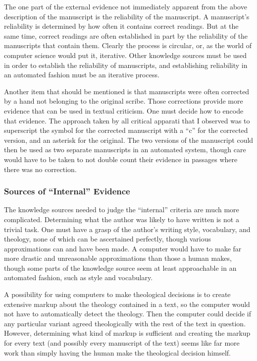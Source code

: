 \documentclass[onecolumn, 12pt]{article}
\begin{document}
The one part of the external evidence not immediately apparent from the above
description of the manuscript is the reliability of the manuscript.  A
manuscript's reliability is determined by how often it contains correct
readings.  But at the same time, correct readings are often established in part
by the reliability of the manuscripts that contain them.  Clearly the process
is circular, or, as the world of computer science would put it, iterative.
Other knowledge sources must be used in order to establish the reliability of
manuscripts, and establishing reliability in an automated fashion must be an
iterative process.

Another item that should be mentioned is that manuscripts were often corrected
by a hand not belonging to the original scribe.  Those corrections provide more
evidence that can be used in textual criticism.  One must decide how to encode
that evidence.  The approach taken by all critical apparati that I observed
was to superscript the symbol for the corrected manuscript with a ``c'' for the
corrected version, and an asterisk for the original.  The two versions of the
manuscript could then be used as two separate manuscripts in an automated
system, though care would have to be taken to not double count their evidence
in passages where there was no correction.

\subsubsection{Sources of ``Internal'' Evidence}

The knowledge sources needed to judge the ``internal'' criteria are much more
complicated.  Determining what the author was likely to have written is not a
trivial task.  One must have a grasp of the author's writing style, vocabulary,
and theology, none of which can be ascertained perfectly, though various
approximations can and have been made.  A computer would have to make far more
drastic and unreasonable approximations than those a human makes, though some
parts of the knowledge source seem at least approachable in an automated
fashion, such as style and vocabulary.

A possibility for using computers to make theological decisions is to create
extensive markup about the theology contained in a text, so the computer would
not have to automatically detect the theology.  Then the computer could decide
if any particular variant agreed theologically with the rest of the text in
question.  However, determining what kind of markup is sufficient and creating
the markup for every text (and possibly every manuscript of the text) seems
like far more work than simply having the human make the theological decision
himself.
\end{document}
